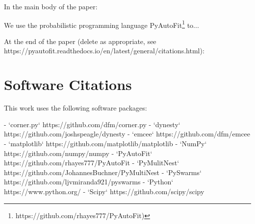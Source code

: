 In the main body of the paper:

We use the probabilistic programming language PyAutoFit\footnote{https://github.com/rhayes777/PyAutoFit)} \citep{pyautofit} to...

At the end of the paper (delete as appropriate, see https://pyautofit.readthedocs.io/en/latest/general/citations.html):

\section{Software Citations}

This work uses the following software packages:

- `corner.py` https://github.com/dfm/corner.py \citep{corner}
- `dynesty` https://github.com/joshspeagle/dynesty \citep{Dynesty}
- `emcee` https://github.com/dfm/emcee \citep{emcee}
- `matplotlib` https://github.com/matplotlib/matplotlib \citep{matplotlib}
- `NumPy` https://github.com/numpy/numpy \citep{numpy}
- `PyAutoFit` https://github.com/rhayes777/PyAutoFit \citep{pyautofit}
- `PyMulitNest` https://github.com/JohannesBuchner/PyMultiNest \citep{multinest} \citep{pymultinest}
- `PySwarms` https://github.com/ljvmiranda921/pyswarms \citep{pyswarms}
- `Python` https://www.python.org/ \citep{python}
- `Scipy` https://github.com/scipy/scipy \citep{scipy}
